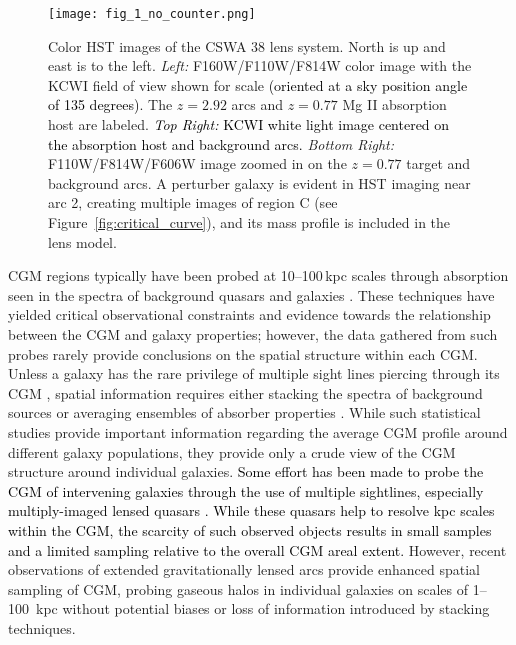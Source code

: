 \documentclass[twocolumn]{aastex62}
\newcommand{\MgII}{Mg\tiny{ }\footnotesize{II}\normalsize{ }}
\newcommand{\comment}[1]{\textcolor{black}{#1}}
\begin{document}
\begin{figure*}[ht!]

\centerline{
\texttt{[image: fig\_1\_no\_counter.png]}
}
\caption{
Color HST images of the CSWA 38 lens system. North is up and east is to the left. 
{\em Left:} F160W/F110W/F814W color image with the KCWI field of view shown for scale \comment{(oriented at a sky position angle of 135 degrees)}. The $z=2.92$ arcs and $z=0.77$ \MgII absorption host are labeled. \comment{{\em Top Right:} KCWI white light image centered on the absorption host and background arcs.}
{\em Bottom Right:} F110W/F814W/F606W image zoomed in on the $z=0.77$ target and background arcs. A perturber galaxy is evident in HST imaging near arc 2, creating multiple images of region C (see Figure~\ref{fig:critical_curve}), and its mass profile is included in the lens model.
} \label{fig:image}
\end{figure*}



CGM regions typically have been probed at 10--100\,kpc scales through absorption seen in the spectra of background quasars \citep[e.g.,][]{Nielsen2013b,Prochaska2017,Tumlinson2017,Chen2017} and galaxies \citep[e.g.,][]{Steidel2010,Diamond-Stanic2016,Rubin2018b}. 
These techniques have yielded critical observational constraints and evidence towards the relationship between the CGM and galaxy properties; however, the data gathered from such probes rarely provide conclusions on the spatial structure within each CGM. Unless a galaxy has the rare privilege of multiple sight lines piercing through its CGM \citep[e.g.,][]{Lehner2020}, spatial information requires either stacking the spectra of background sources \citep[e.g.,][]{Steidel2010,Bordoloi2011,Rubin2018a,Rubin2018c} or averaging ensembles of absorber properties \citep{Chen2010,Nielsen2013a}. 
While such statistical studies provide important information regarding the average CGM profile around different galaxy populations, they provide only a crude view of the CGM structure around individual galaxies. \textcolor{black}{Some effort has been made to probe the CGM of intervening galaxies through the use of multiple sightlines, especially multiply-imaged lensed quasars \citep{Smette1992, Lopez1999, Lopez2005, Lopez2007, Rauch2001, Ellison2004, Chen2014, Zahedy2016, Rubin2018c, Zabl2020}. While these quasars help to resolve kpc scales within the CGM, the scarcity of such observed objects results in small samples and a limited sampling relative to the overall CGM areal extent.}
However, recent observations of extended gravitationally lensed arcs \citep{Lopez2018, Lopez2020} provide enhanced spatial sampling of CGM, probing gaseous halos in individual galaxies on scales of 1--100~kpc without potential biases or loss of information introduced by stacking techniques.
\end{document}

